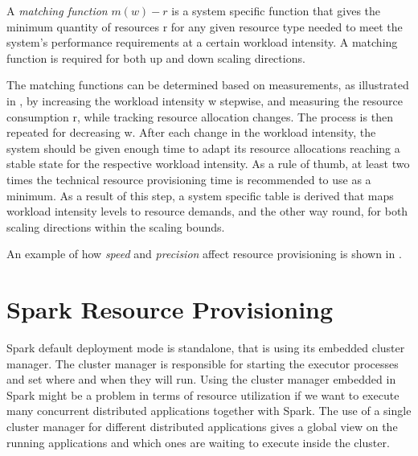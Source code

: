 A \textit{matching function} $m(w) - r$ is a system specific function that gives the minimum quantity of resources r for any given resource type needed to meet the system’s performance requirements at a certain workload intensity. A matching function is required for both up and down scaling directions.

The matching functions can be determined based on measurements, as illustrated in , by increasing the workload intensity w stepwise, and measuring the resource consumption r, while tracking resource allocation changes. The process is then repeated for decreasing w. After each change in the workload intensity, the system should be given enough time to adapt its resource allocations reaching a stable state for the respective workload intensity. As a rule of thumb, at least two times the technical resource provisioning time is recommended to use as a minimum. As a result of this step, a system specific table is derived that maps workload intensity levels to resource demands, and the other way round, for both scaling directions within the scaling bounds.

An example of how \textit{speed} and \textit{precision} affect resource provisioning is shown in .


\section{Spark Resource Provisioning}\label{sec:spark_resource_provisioning}
Spark default deployment mode is standalone, that is using its embedded cluster manager. The cluster manager is responsible for starting the executor processes and set where and when they will run. Using the cluster manager embedded in Spark might be a problem in terms of resource utilization if we want to execute many concurrent distributed applications together with Spark. The use of a single cluster manager for different distributed applications gives a global view on the running applications and which ones are waiting to execute inside the cluster.

